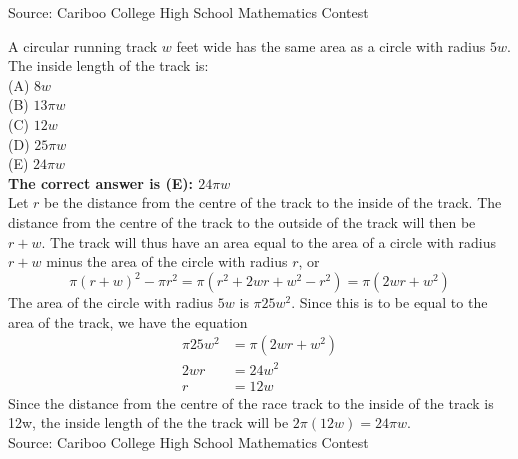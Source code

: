 \documentclass{article}
\begin{document}
\scriptsize
Source: Cariboo College High School Mathematics Contest

\normalsize
A circular running track $w$ feet wide has the same area as a circle with radius $5w$. The inside length of the track is:\\
(A) $8w$\\
(B) $13\pi w$\\
(C) $12w$\\
(D) $25\pi w$\\
(E) $24\pi w$\\


\textbf{The correct answer is (E): $24\pi w$}\\[1 ex]
Let $r$ be the distance from the centre of the track to the inside of the track. The distance from the centre of the track to the outside of the track will then be $r+w$. The track will thus have an area equal to the area of a circle with radius $r+w$ minus the area of the circle with radius $r$, or
\begin{equation*}
\pi(r+w)^{2}-\pi r^{2}=\pi(r^{2}+2wr+w^{2}-r^{2})=\pi(2wr+w^{2})
\end{equation*}
The area of the circle with radius $5w$ is $\pi25w^2$. Since this is to be equal to the area of the track, we have the equation
\begin{align*}
\pi25w^{2}&=\pi(2wr+w^{2})\\
2wr&=24w^{2}\\
r&=12w
\end{align*}
Since the distance from the centre of the race track to the inside of the track is 12w, the inside length of the the track will be $2\pi(12w)=24\pi w$.
\\[5 ex]

\scriptsize
Source: Cariboo College High School Mathematics Contest
\end{document}
